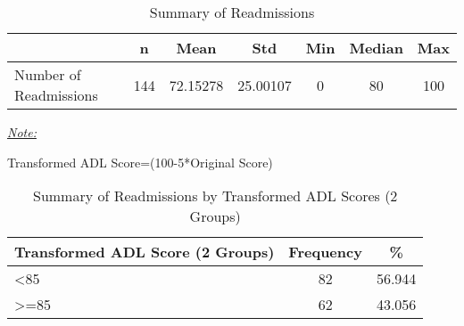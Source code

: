 \documentclass[12pt,]{article}
\begin{document}
\pagebreak

\begin{table}[!h]

\caption{\label{tab:unnamed-chunk-16}Summary of Readmissions}
\centering
\begin{threeparttable}
\begin{tabular}{>{\raggedright\arraybackslash}p{5cm}cccccc}
\toprule
  & n & Mean & Std & Min & Median & Max\\
\midrule
\rowcolor{white}  Number of Readmissions & 144 & 72.15278 & 25.00107 & 0 & 80 & 100\\
\bottomrule
\end{tabular}
\begin{tablenotes}[para]
\item \underline{\textit{Note:}} 
\item Transformed ADL Score=(100-5*Original Score)
\end{tablenotes}
\end{threeparttable}
\end{table}

\begin{table}[!h]

\caption{\label{tab:unnamed-chunk-16}Summary of Readmissions by Transformed ADL Scores (2 Groups)}
\centering
\begin{tabular}{>{\centering\arraybackslash}p{5cm}cc}
\toprule
Transformed ADL Score (2 Groups) & Frequency & \%\\
\midrule
<85 & 82 & 56.944\\
\rowcolor[HTML]{E3E5E7}  >=85 & 62 & 43.056\\
\bottomrule
\end{tabular}
\end{table}

\pagebreak
\end{document}
